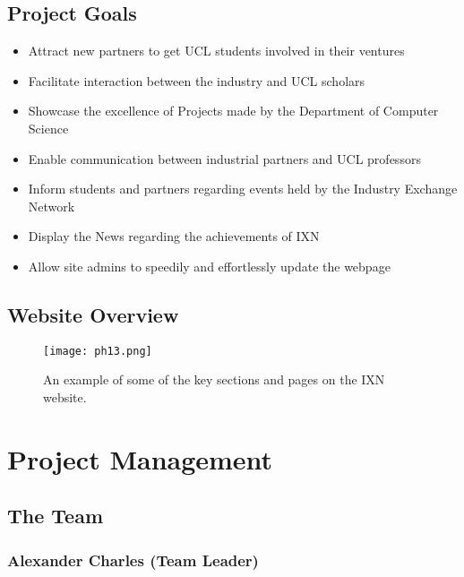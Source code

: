 \documentclass[fontsize=11pt]{extarticle}
\numberwithin{figure}{section} %
\numberwithin{table}{section}%
\begin{document}
\hypertarget{project-goals}{%
\subsection{Project Goals}\label{project-goals}}

\begin{itemize}
\item
  Attract new partners to get UCL students involved in their ventures
\item
  Facilitate interaction between the industry and UCL scholars
\item
  Showcase the excellence of Projects made by the Department of Computer
  Science
\item
  Enable communication between industrial partners and UCL professors
\item
  Inform students and partners regarding events held by the Industry
  Exchange Network
\item
  Display the News regarding the achievements of IXN
\item
  Allow site admins to speedily and effortlessly update the webpage
\end{itemize}

\hypertarget{website-overview}{%
\subsection{Website Overview}\label{website-overview}}

\begin{figure}[H]
      \centering
      \texttt{[image: ph13.png]}
      \caption{An example of some of the key sections and pages on the IXN website.}
 \end{figure}

\hypertarget{project-management}{%
\section{Project Management}\label{project-management}}

\hypertarget{the-team}{%
\subsection{The Team}\label{the-team}}

\hypertarget{alexander-charles-team-leader}{%
\subsubsection{Alexander Charles (Team
Leader)}\label{alexander-charles-team-leader}}
\end{document}
